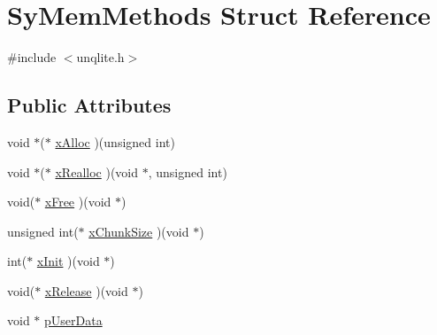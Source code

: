 \hypertarget{struct_sy_mem_methods}{\section{Sy\-Mem\-Methods Struct Reference}
\label{de/d5d/struct_sy_mem_methods}
}


{\ttfamily \#include $<$unqlite.\-h$>$}

\subsection*{Public Attributes}
\begin{DoxyCompactItemize}
\item 
void $\ast$($\ast$ \hyperlink{struct_sy_mem_methods_a0c07173c42658f654805a2b5a00fb470}{x\-Alloc} )(unsigned int)
\item 
void $\ast$($\ast$ \hyperlink{struct_sy_mem_methods_a1cb3b69a9c1828ab4b193185a9217cb2}{x\-Realloc} )(void $\ast$, unsigned int)
\item 
void($\ast$ \hyperlink{struct_sy_mem_methods_a17727c244d441b82fdef13f1f3a333cf}{x\-Free} )(void $\ast$)
\item 
unsigned int($\ast$ \hyperlink{struct_sy_mem_methods_acab2915281ea3495d9b728f1f878554a}{x\-Chunk\-Size} )(void $\ast$)
\item 
int($\ast$ \hyperlink{struct_sy_mem_methods_ad2026eb5051f4fafa40a9fcea747660e}{x\-Init} )(void $\ast$)
\item 
void($\ast$ \hyperlink{struct_sy_mem_methods_a24a71f26e436ed86fae0ab8a33bd6388}{x\-Release} )(void $\ast$)
\item 
void $\ast$ \hyperlink{struct_sy_mem_methods_ab71115d9f01d99699680465a58f2574b}{p\-User\-Data}
\end{DoxyCompactItemize}


